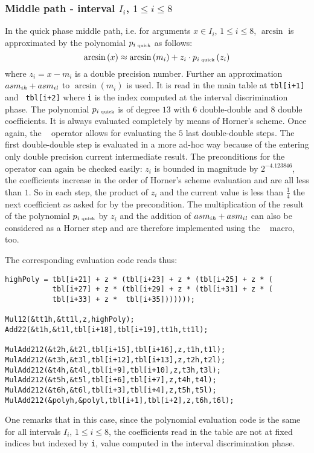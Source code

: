 \subsubsection{Middle path - interval $I_i$, $1 \leq i \leq 8$}
In the quick phase middle path, i.e. for arguments $x \in I_i$, $1
\leq i \leq 8$, $\arcsin$ is approximated by the polynomial
$p_{i\mbox{\tiny ~quick}}$ as follows:
$$\arcsin\left( x \right) \approx \arcsin\left( m_i \right) + z_i \cdot p_{i\mbox{\tiny ~quick}}\left( z_i \right)$$
where $z_i = x - m_i$ is a double precision number.  Further an
approximation $asm_{i\mathit{h}} + asm_{i\mathit{l}}$ to $\arcsin\left( m_i \right)$
is used. It is read in the main table at {\tt tbl[i+1]} and {\tt
  tbl[i+2]} where {\tt i} is the index computed at the interval
discrimination phase.  The polynomial $p_{i\mbox{\tiny ~quick}}$ is of
degree $13$ with $6$ double-double and $8$ double coefficients.  It is
always evaluated completely by means of Horner's scheme. Once again,
the \MulAddDdD~ operator allows for evaluating the $5$ last
double-double steps. The first double-double step is evaluated in a
more ad-hoc way because of the entering only double precision current
intermediate result. The preconditions for the \MulAddDdD~ operator
can again be checked easily: $z_i$ is bounded in magnitude by
$2^{-4.123846}$, the coefficients increase in the order of Horner's
scheme evaluation and are all less than $1$. So in each step, the
product of $z_i$ and the current value is less than $\frac{1}{4}$ the
next coefficient as asked for by the precondition.  The multiplication
of the result of the polynomial $p_{i\mbox{\tiny ~quick}}$ by $z_i$
and the addition of $asm_{i\mathit{h}} + asm_{i\mathit{l}}$ can also be considered
as a Horner step and are therefore implemented using the \MulAddDdD~
macro, too. 

The corresponding evaluation code reads thus:
\begin{lstlisting}[caption={Middle path quick phase polynomial approximation},firstnumber=1]
highPoly = tbl[i+21] + z * (tbl[i+23] + z * (tbl[i+25] + z * (
           tbl[i+27] + z * (tbl[i+29] + z * (tbl[i+31] + z * ( 
           tbl[i+33] + z *  tbl[i+35]))))));
  
Mul12(&tt1h,&tt1l,z,highPoly);
Add22(&t1h,&t1l,tbl[i+18],tbl[i+19],tt1h,tt1l);

MulAdd212(&t2h,&t2l,tbl[i+15],tbl[i+16],z,t1h,t1l);
MulAdd212(&t3h,&t3l,tbl[i+12],tbl[i+13],z,t2h,t2l);
MulAdd212(&t4h,&t4l,tbl[i+9],tbl[i+10],z,t3h,t3l);
MulAdd212(&t5h,&t5l,tbl[i+6],tbl[i+7],z,t4h,t4l);
MulAdd212(&t6h,&t6l,tbl[i+3],tbl[i+4],z,t5h,t5l);
MulAdd212(&polyh,&polyl,tbl[i+1],tbl[i+2],z,t6h,t6l);
\end{lstlisting} 
One remarks that in this case, since the polynomial evaluation code is
the same for all intervals $I_i$, $1 \leq i \leq 8$, the coefficients
read in the table are not at fixed indices but indexed by {\tt i},
value computed in the interval discrimination phase. 

